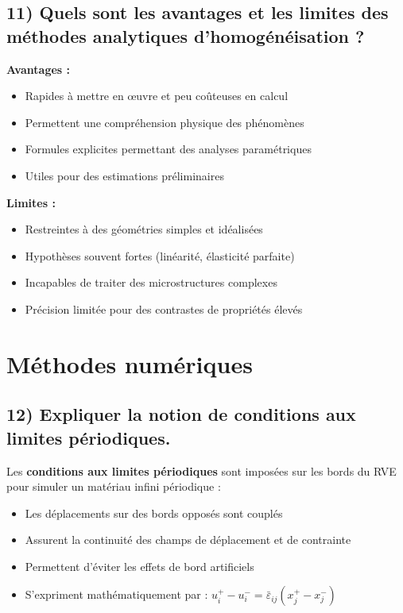 \documentclass{rapportECL}
\begin{document}
\subsection*{11) Quels sont les avantages et les limites des méthodes analytiques d'homogénéisation ?}

\begin{tcolorbox}[colback=white!5!white,colframe=blue!75!black]
\textbf{Avantages :}
\begin{itemize}[noitemsep]
\item Rapides à mettre en œuvre et peu coûteuses en calcul
\item Permettent une compréhension physique des phénomènes
\item Formules explicites permettant des analyses paramétriques
\item Utiles pour des estimations préliminaires
\end{itemize}

\textbf{Limites :}
\begin{itemize}[noitemsep]
\item Restreintes à des géométries simples et idéalisées
\item Hypothèses souvent fortes (linéarité, élasticité parfaite)
\item Incapables de traiter des microstructures complexes
\item Précision limitée pour des contrastes de propriétés élevés
\end{itemize}
\end{tcolorbox}

\section{Méthodes numériques}

\subsection*{12) Expliquer la notion de conditions aux limites périodiques.}

\begin{tcolorbox}[colback=white!5!white,colframe=blue!75!black]
Les \textbf{conditions aux limites périodiques} sont imposées sur les bords du RVE pour simuler un matériau infini périodique :
\begin{itemize}[noitemsep]
\item Les déplacements sur des bords opposés sont couplés
\item Assurent la continuité des champs de déplacement et de contrainte
\item Permettent d'éviter les effets de bord artificiels
\item S'expriment mathématiquement par : $u_i^+ - u_i^- = \bar{\varepsilon}_{ij} (x_j^+ - x_j^-)$
\end{itemize}
\end{tcolorbox}
\end{document}
